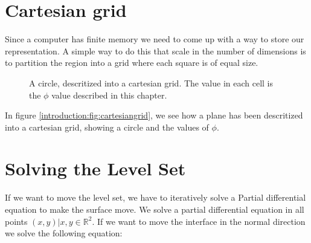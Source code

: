 \section*{Cartesian grid}

Since a computer has finite memory we need to come up with a way to
store our representation. A simple way to do this that scale in the
number of dimensions is to partition the region into a grid where each
square is of equal size.

\begin{figure}[htb] \centering
  \caption{A circle, descritized into a
cartesian grid. The value in each cell is the $\phi$ value described
in this chapter.}
  \label{introduction:fig:cartesiangrid}
\end{figure}

In figure \vref{introduction:fig:cartesiangrid}, we see how a plane
has been descritized into a cartesian grid, showing a circle and the
values of $\phi$.


\section*{Solving the Level Set}\label{sec:intro:solve} 


If we want to move the level set, we have to iteratively solve a Partial
differential equation to make the surface move. We solve a partial
differential equation in all points $(x,y) | x,y \in
\mathbb{R}^{2}$. If we want to move the interface in the normal
direction we solve the following equation:

